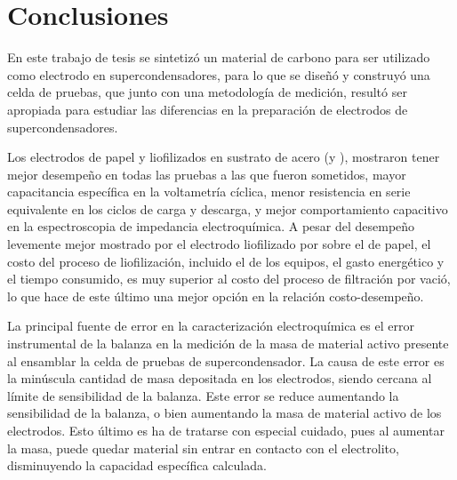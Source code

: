 \chapter{Conclusiones}
En este trabajo de tesis se sintetizó un material de carbono para ser utilizado como electrodo en supercondensadores, para lo que se diseñó y construyó una celda de pruebas, que junto con una metodología de medición, resultó ser apropiada para estudiar las diferencias en la preparación de electrodos de supercondensadores.

Los electrodos de papel y liofilizados en sustrato de acero (\mPapelAcero y \mLiofilizadoAcero), mostraron tener mejor desempeño en todas las pruebas a las que fueron sometidos, mayor capacitancia específica en la voltametría cíclica, menor resistencia en serie equivalente en los ciclos de carga y descarga, y mejor comportamiento capacitivo en la espectroscopia de impedancia electroquímica. A pesar del desempeño levemente mejor mostrado por el electrodo liofilizado por sobre el de papel, el costo del proceso de liofilización, incluido el de los equipos, el gasto energético y el tiempo consumido, es muy superior al costo del proceso de filtración por vació, lo que hace de este último una mejor opción en la relación costo-desempeño.

La principal fuente de error en la caracterización electroquímica es el error instrumental de la balanza en la medición de la masa de material activo presente al ensamblar la celda de pruebas de supercondensador. La causa de este error es la minúscula cantidad de masa depositada en los electrodos, siendo cercana al límite de sensibilidad de la balanza. Este error se reduce aumentando la sensibilidad de la balanza, o bien aumentando la masa de material activo de los electrodos. Esto último es ha de tratarse con especial cuidado, pues al aumentar la masa, puede quedar material sin entrar en contacto con el electrolito, disminuyendo la capacidad específica calculada. 